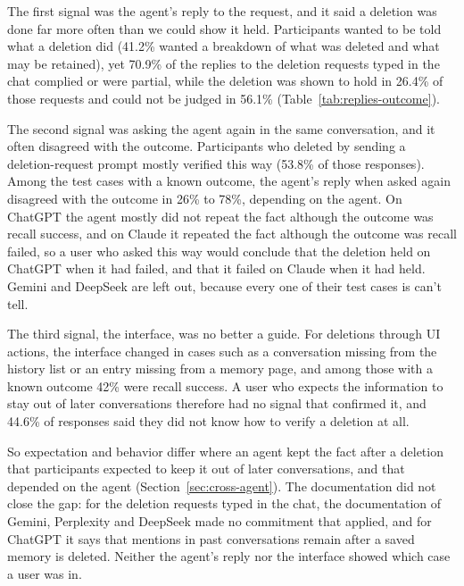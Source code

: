     The first signal was the agent's reply to the request, and it said a deletion was done far more often than we could show it held. Participants wanted to be told what a deletion did (41.2\% wanted a breakdown of what was deleted and what may be retained), yet 70.9\% of the replies to the deletion requests typed in the chat complied or were partial, while the deletion was shown to hold in 26.4\% of those requests and could not be judged in 56.1\% (Table~\ref{tab:replies-outcome}).

    The second signal was asking the agent again in the same conversation, and it often disagreed with the outcome. Participants who deleted by sending a deletion-request prompt mostly verified this way (53.8\% of those responses). Among the test cases with a known outcome, the agent's reply when asked again disagreed with the outcome in 26\% to 78\%, depending on the agent. On ChatGPT the agent mostly did not repeat the fact although the outcome was recall success, and on Claude it repeated the fact although the outcome was recall failed, so a user who asked this way would conclude that the deletion held on ChatGPT when it had failed, and that it failed on Claude when it had held. Gemini and DeepSeek are left out, because every one of their test cases is can't tell.

    The third signal, the interface, was no better a guide. For deletions through UI actions, the interface changed in cases such as a conversation missing from the history list or an entry missing from a memory page, and among those with a known outcome 42\% were recall success. A user who expects the information to stay out of later conversations therefore had no signal that confirmed it, and 44.6\% of responses said they did not know how to verify a deletion at all.

    So expectation and behavior differ where an agent kept the fact after a deletion that participants expected to keep it out of later conversations, and that depended on the agent (Section~\ref{sec:cross-agent}). The documentation did not close the gap: for the deletion requests typed in the chat, the documentation of Gemini, Perplexity and DeepSeek made no commitment that applied, and for ChatGPT it says that mentions in past conversations remain after a saved memory is deleted. Neither the agent's reply nor the interface showed which case a user was in.

    \FloatBarrier
